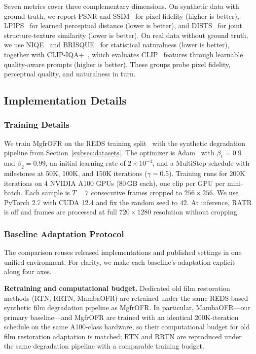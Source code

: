 \documentclass[symmetry,article,submit,pdftex,moreauthors]{Definitions/mdpi}
\begin{document}
Seven metrics cover three complementary dimensions. On synthetic data with ground truth, we report PSNR and SSIM~\cite{wang2004ssim} for pixel fidelity (higher is better), LPIPS~\cite{zhang2018lpips} for learned perceptual distance (lower is better), and DISTS~\cite{ding2020dists} for joint structure-texture similarity (lower is better). On real data without ground truth, we use NIQE~\cite{mittal2012niqe} and BRISQUE~\cite{mittal2012brisque} for statistical naturalness (lower is better), together with CLIP-IQA+~\cite{wang2023clipiqa}, which evaluates CLIP~\cite{radford2021clip} features through learnable quality-aware prompts (higher is better). These groups probe pixel fidelity, perceptual quality, and naturalness in turn.

\subsection{Implementation Details}
\label{subsec:implementation}

\subsubsection{Training Details}
\label{subsubsec:training_details}

We train MgfrOFR on the REDS training split~\cite{nah2019reds} with the synthetic degradation pipeline from Section~\ref{subsec:datasets}. The optimizer is Adam~\cite{kingma2015adam} with $\beta_1=0.9$ and $\beta_2=0.99$, an initial learning rate of $2\times10^{-4}$, and a MultiStep schedule with milestones at 50K, 100K, and 150K iterations ($\gamma=0.5$). Training runs for $200$K iterations on $4$ NVIDIA A100 GPUs (80\,GB each), one clip per GPU per mini-batch. Each sample is $T=7$ consecutive frames cropped to $256\times256$. We use PyTorch 2.7 with CUDA 12.4 and fix the random seed to 42. At inference, RATR is off and frames are processed at full $720 \times 1280$ resolution without cropping.

\subsubsection{Baseline Adaptation Protocol}
\label{subsubsec:baseline_adaptation}

The comparison reuses released implementations and published settings in one unified environment. For clarity, we make each baseline's adaptation explicit along four axes.

\textbf{Retraining and computational budget.} Dedicated old film restoration methods (RTN, RRTN, MambaOFR) are retrained under the same REDS-based synthetic film degradation pipeline as MgfrOFR. In particular, MambaOFR---our primary baseline---and MgfrOFR are trained with an identical 200K-iteration schedule on the same A100-class hardware, so their computational budget for old film restoration adaptation is matched; RTN and RRTN are reproduced under the same degradation pipeline with a comparable training budget.
\end{document}
